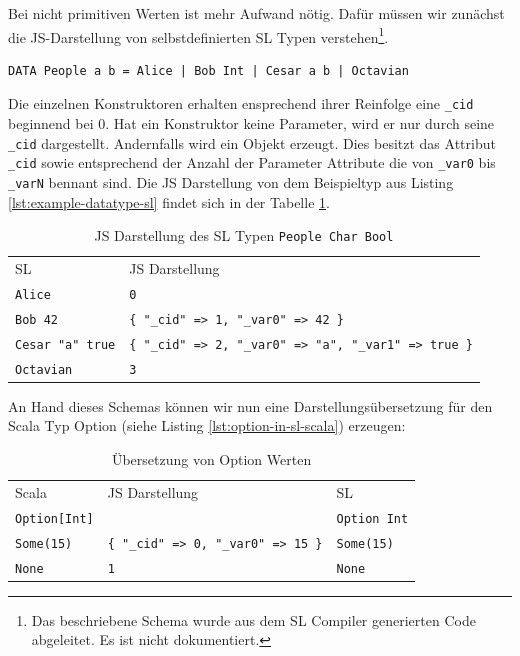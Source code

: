 \documentclass[12pt]{scrreprt}
\begin{document}
Bei nicht primitiven Werten ist mehr Aufwand nötig. Dafür müssen wir zunächst die JS-Darstellung von selbstdefinierten SL Typen verstehen\footnote{Das beschriebene Schema wurde aus dem SL Compiler generierten Code abgeleitet. Es ist nicht dokumentiert.}.

\begin{lstlisting}[caption=Beispiel eines selbstedefinierten Typs, label=lst:example-datatype-sl]
DATA People a b = Alice | Bob Int | Cesar a b | Octavian
\end{lstlisting}

Die einzelnen Konstruktoren erhalten ensprechend ihrer Reinfolge eine \lstinline!_cid! beginnend bei $0$. Hat ein Konstruktor keine Parameter, wird er nur durch seine \lstinline!_cid! dargestellt. Andernfalls wird ein Objekt erzeugt. Dies besitzt das Attribut \lstinline!_cid! sowie entsprechend der Anzahl der Parameter Attribute die von \lstinline!_var0! bis \lstinline!_varN! bennant sind. Die JS Darstellung von dem Beispieltyp aus Listing \ref{lst:example-datatype-sl} findet sich in der Tabelle \ref{tab:js-code-of-people}.

\begin{table}[h]
\caption{JS Darstellung des \ac{SL} Typen \lstinline!People Char Bool!}
\centering
\begin{tabular}{ll}
 \ac{SL}              &  \ac{JS} Darstellung \\
\lstinline!Alice!           &  \lstinline!0! \\
\lstinline!Bob 42!          &  \lstinline!{ "_cid" => 1, "_var0" => 42 }! \\
\lstinline!Cesar "a" true!  &  \lstinline!{ "_cid" => 2, "_var0" => "a", "_var1" => true }! \\
\lstinline!Octavian!        &  \lstinline!3! \\
\end{tabular}
\label{tab:js-code-of-people}
\end{table}

An Hand dieses Schemas können wir nun eine Darstellungsübersetzung für den Scala Typ Option (siehe Listing \ref{lst:option-in-sl-scala}) erzeugen:

\begin{table}[h]
\caption{Übersetzung von Option Werten}
\centering
\begin{tabular}{lll}
Scala                   & \ac{JS} Darstellung                        & SL \\

\lstinline!Option[Int]! &                                            & \lstinline!Option Int! \\

\lstinline!Some(15)!    & \lstinline!{ "_cid" => 0, "_var0" => 15 }! & \lstinline!Some(15)! \\
\lstinline!None!        & \lstinline!1!                              &  \lstinline!None! \\
\end{tabular}
\end{table}
\end{document}
